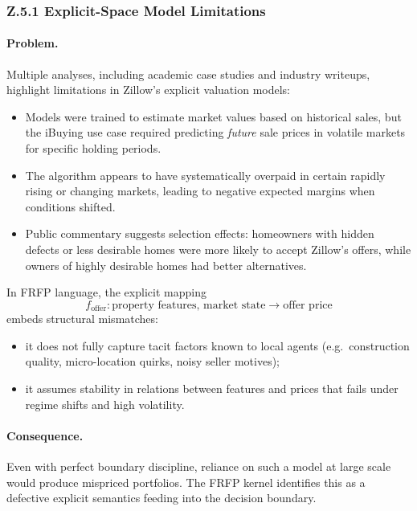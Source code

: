 \subsubsection*{Z.5.1 Explicit-Space Model Limitations}

\paragraph{Problem.}
Multiple analyses, including academic case studies and industry writeups,
highlight limitations in Zillow’s explicit valuation models:

\begin{itemize}
  \item Models were trained to estimate market values based on historical
        sales, but the iBuying use case required predicting \emph{future}
        sale prices in volatile markets for specific holding periods.
  \item The algorithm appears to have systematically overpaid in certain
        rapidly rising or changing markets, leading to negative expected
        margins when conditions shifted.
  \item Public commentary suggests selection effects:
        homeowners with hidden defects or less desirable homes were more
        likely to accept Zillow’s offers, while owners of highly desirable
        homes had better alternatives.
\end{itemize}

In FRFP language, the explicit mapping
\[
  f_{\mathrm{offer}} : \text{property features, market state} \to
  \text{offer price}
\]
embeds structural mismatches:

\begin{itemize}
  \item it does not fully capture tacit factors known to local agents
        (e.g.\ construction quality, micro-location quirks, noisy seller
        motives);
  \item it assumes stability in relations between features and prices that
        fails under regime shifts and high volatility.
\end{itemize}

\paragraph{Consequence.}
Even with perfect boundary discipline, reliance on such a model at large
scale would produce mispriced portfolios.
The FRFP kernel identifies this as a defective explicit semantics feeding
into the decision boundary.

